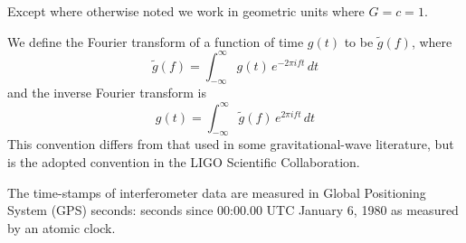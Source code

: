 \documentclass[12pt,notitlepage]{report}
\begin{document}
Except where otherwise noted we work in geometric units where
$G=c=1$.

\vspace{0.5cm}

We define the Fourier transform of a function of time $g(t)$ to be
$\tilde{g}(f)$, where
%
\begin{equation*}
\tilde{g}(f)=\int_{-\infty}^\infty g(t)\, e^{- 2 \pi i f t}\, dt
\end{equation*}
%
and the inverse Fourier transform is
%
\begin{equation*}
g(t)=\int_{-\infty}^\infty \tilde{g}(f)\, e^{2 \pi i f t}\, dt
\end{equation*}
%
This convention differs from that used in some gravitational-wave
literature, but is the adopted convention in the LIGO Scientific
Collaboration.

\vspace{0.5cm}

\noindent The time-stamps of interferometer data are measured in
Global Positioning System (GPS) seconds: seconds since 00:00.00 UTC
January 6, 1980 as measured by an atomic clock.


\afterpreface

\label{ch:introduction}


\label{ch:theory}


\label{ch:ligo_detectors}


\label{ch:search}


\label{ch:comparison}


\label{ch:ninja1}


\label{ch:ninja2}


\label{ch:ninja2_results}


\label{ch:segdb}


\label{ch:detchar}


\label{ch:conclusions}


\appendix
{}
\label{ch:pn_waveforms}


\clearpage


\end{document}
